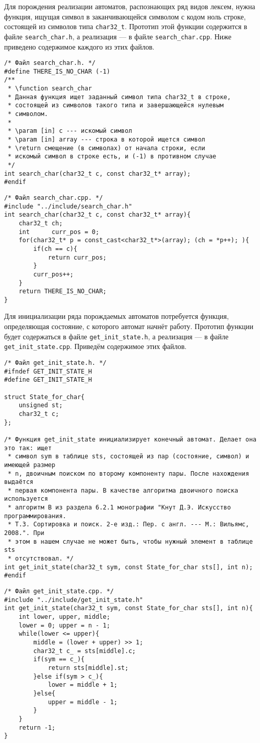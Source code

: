 \documentclass[10pt]{report}
\newcounter{defin}[section]
\begin{document}
Для порождения реализации автоматов, распознающих ряд видов лексем, нужна функция, ищущая символ в заканчивающейся символом с кодом ноль строке, состоящей из символов типа \texttt{char32_t}. Прототип этой функции содержится в файле \texttt{search_char.h}, а реализация --- в файле \texttt{search_char.cpp}. Ниже приведено содержимое каждого из этих файлов.
\begin{verbatim}
/* Файл search_char.h. */
#define THERE_IS_NO_CHAR (-1)
/**
 * \function search_char
 * Данная функция ищет заданный символ типа char32_t в строке,
 * состоящей из символов такого типа и завершающейся нулевым
 * символом.
 *
 * \param [in] c --- искомый символ
 * \param [in] array --- строка в которой ищется символ
 * \return смещение (в символах) от начала строки, если
 * искомый символ в строке есть, и (-1) в противном случае
 */
int search_char(char32_t c, const char32_t* array);
#endif
\end{verbatim}
\begin{verbatim}
/* Файл search_char.cpp. */
#include "../include/search_char.h"
int search_char(char32_t c, const char32_t* array){
    char32_t ch;
    int      curr_pos = 0;
    for(char32_t* p = const_cast<char32_t*>(array); (ch = *p++); ){
        if(ch == c){
            return curr_pos;
        }
        curr_pos++;
    }
    return THERE_IS_NO_CHAR;
}
\end{verbatim}

Для инициализации ряда порождаемых автоматов потребуется функция, определяющая состояние, с которого автомат начнёт работу. Прототип функции будет содержаться в файле \texttt{get_init_state.h}, а реализация --- в файле \texttt{get_init_state.cpp}. Приведём содержимое этих файлов.
\begin{verbatim}
/* Файл get_init_state.h. */
#ifndef GET_INIT_STATE_H
#define GET_INIT_STATE_H

struct State_for_char{
    unsigned st;
    char32_t c;
};

/* Функция get_init_state инициализирует конечный автомат. Делает она это так: ищет
 * символ sym в таблице sts, состоящей из пар (состояние, символ) и имеющей размер
 * n, двоичным поиском по второму компоненту пары. После нахождения выдаётся
 * первая компонента пары. В качестве алгоритма двоичного поиска используется
 * алгоритм B из раздела 6.2.1 монографии "Кнут Д.Э. Искусство программирования.
 * Т.3. Сортировка и поиск. 2-е изд.: Пер. с англ. --- М.: Вильямс, 2008.". При
 * этом в нашем случае не может быть, чтобы нужный элемент в таблице sts
 * отсутствовал. */
int get_init_state(char32_t sym, const State_for_char sts[], int n);
#endif
\end{verbatim}
\begin{verbatim}
/* Файл get_init_state.cpp. */
#include "../include/get_init_state.h"
int get_init_state(char32_t sym, const State_for_char sts[], int n){
    int lower, upper, middle;
    lower = 0; upper = n - 1;
    while(lower <= upper){
        middle = (lower + upper) >> 1;
        char32_t c_ = sts[middle].c;
        if(sym == c_){
            return sts[middle].st;
        }else if(sym > c_){
            lower = middle + 1;
        }else{
            upper = middle - 1;
        }
    }
    return -1;
}
\end{verbatim}
\end{document}
